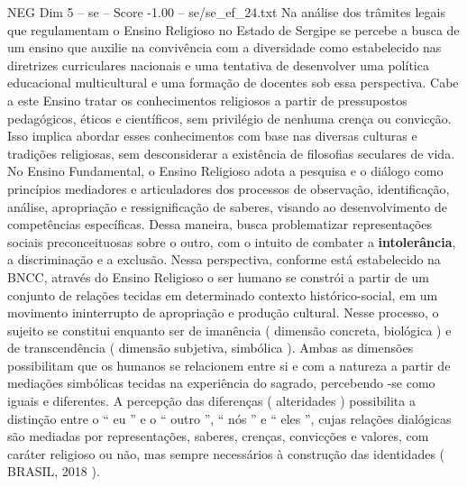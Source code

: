 \begin{textsample}{NEG Dim 5 – se – Score -1.00 – se/se\_ef\_24.txt}
Na análise dos trâmites legais que regulamentam o Ensino Religioso no Estado de Sergipe se percebe a busca de um ensino que auxilie na convivência com a diversidade como estabelecido nas diretrizes curriculares nacionais e uma tentativa de desenvolver uma política educacional multicultural e uma formação de docentes sob essa perspectiva.
Cabe a este Ensino tratar os conhecimentos religiosos a partir de pressupostos pedagógicos, éticos e científicos, sem privilégio de nenhuma crença ou convicção.
Isso implica abordar esses conhecimentos com base nas diversas culturas e tradições religiosas, sem desconsiderar a existência de filosofias seculares de vida.
No Ensino Fundamental, o Ensino Religioso adota a pesquisa e o diálogo como princípios mediadores e articuladores dos processos de observação, identificação, análise, apropriação e ressignificação de saberes, visando ao desenvolvimento de competências específicas.
Dessa maneira, busca problematizar representações sociais preconceituosas sobre o outro, com o intuito de combater a \textbf{intolerância}, a discriminação e a exclusão.
Nessa perspectiva, conforme está estabelecido na BNCC, através do Ensino Religioso o ser humano se constrói a partir de um conjunto de relações tecidas em determinado contexto histórico-social, em um movimento ininterrupto de apropriação e produção cultural.
Nesse processo, o sujeito se constitui enquanto ser de imanência ( dimensão concreta, biológica ) e de transcendência ( dimensão subjetiva, simbólica ).
Ambas as dimensões possibilitam que os humanos se relacionem entre si e com a natureza a partir de mediações simbólicas tecidas na experiência do sagrado, percebendo -se como iguais e diferentes.
A percepção das diferenças ( alteridades ) possibilita a distinção entre o “ eu ” e o “ outro ”, “ nós ” e “ eles ”, cujas relações dialógicas são mediadas por representações, saberes, crenças, convicções e valores, com caráter religioso ou não, mas sempre necessários à construção das identidades ( BRASIL, 2018 ).

\end{textsample}

